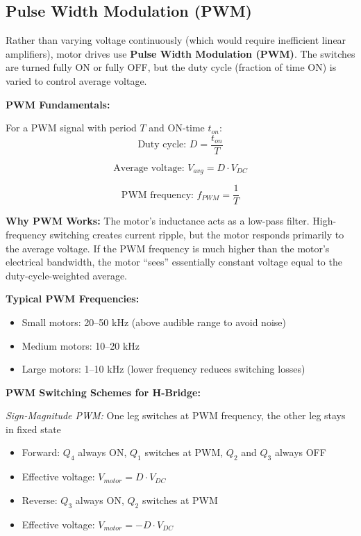 
\subsection{Pulse Width Modulation (PWM)}

Rather than varying voltage continuously (which would require inefficient linear amplifiers), motor drives use \textbf{Pulse Width Modulation (PWM)}. The switches are turned fully ON or fully OFF, but the duty cycle (fraction of time ON) is varied to control average voltage.

\textbf{PWM Fundamentals:}

For a PWM signal with period $T$ and ON-time $t_{on}$:
\begin{equation}
    \text{Duty cycle: } D = \frac{t_{on}}{T}
\end{equation}

\begin{equation}
    \text{Average voltage: } V_{avg} = D \cdot V_{DC}
\end{equation}

\begin{equation}
    \text{PWM frequency: } f_{PWM} = \frac{1}{T}
\end{equation}

\textbf{Why PWM Works:} The motor's inductance acts as a low-pass filter. High-frequency switching creates current ripple, but the motor responds primarily to the average voltage. If the PWM frequency is much higher than the motor's electrical bandwidth, the motor ``sees'' essentially constant voltage equal to the duty-cycle-weighted average.

\textbf{Typical PWM Frequencies:}
\begin{itemize}
    \item Small motors: 20--50 kHz (above audible range to avoid noise)
    \item Medium motors: 10--20 kHz
    \item Large motors: 1--10 kHz (lower frequency reduces switching losses)
\end{itemize}

\textbf{PWM Switching Schemes for H-Bridge:}

\textit{Sign-Magnitude PWM:} One leg switches at PWM frequency, the other leg stays in fixed state
\begin{itemize}
    \item Forward: $Q_4$ always ON, $Q_1$ switches at PWM, $Q_2$ and $Q_3$ always OFF
    \item Effective voltage: $V_{motor} = D \cdot V_{DC}$
    \item Reverse: $Q_3$ always ON, $Q_2$ switches at PWM
    \item Effective voltage: $V_{motor} = -D \cdot V_{DC}$
\end{itemize}

